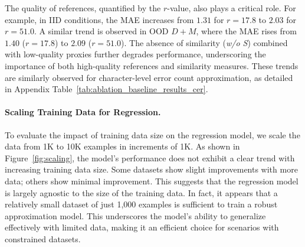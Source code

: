 % 


The quality of references, quantified by the \(r\)-value, also plays a critical role. For example, in IID conditions, the MAE increases from \(1.31\) for \(r=17.8\) to \(2.03\) for \(r=51.0\). A similar trend is observed in OOD \(D+M\), where the MAE rises from \(1.40\) (\(r=17.8\)) to \(2.09\) (\(r=51.0\)). The absence of similarity (\textit{w/o S}) combined with low-quality proxies further degrades performance, underscoring the importance of both high-quality references and similarity measures. These trends are similarly observed for character-level error count approximation, as detailed in Appendix Table~\ref{tab:ablation_baseline_results_cer}.



\paragraph{Scaling Training Data for Regression.}\label{effect_of_scaling_training_data} To evaluate the impact of training data size on the regression model, we scale the data from 1K to 10K examples in increments of 1K. As shown in Figure~\ref{fig:scaling}, the model's performance does not exhibit a clear trend with increasing training data size. Some datasets show slight improvements with more data; others show minimal improvement. This suggests that the regression model is largely agnostic to the size of the training data. In fact, it appears that a relatively small dataset of just 1,000 examples is sufficient to train a robust approximation model. This underscores the model's ability to generalize effectively with limited data, making it an efficient choice for scenarios with constrained datasets.



% 